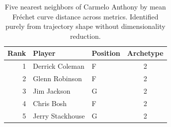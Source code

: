 \begin{table}[htbp]
  \centering\small
  \begin{tabular}{rllc}
    \toprule
    Rank & Player & Position & Archetype \\
    \midrule
    1 & Derrick Coleman & F & 2 \\
    2 & Glenn Robinson & F & 2 \\
    3 & Jim Jackson & G & 2 \\
    4 & Chris Bosh & F & 2 \\
    5 & Jerry Stackhouse & G & 2 \\
    \bottomrule
  \end{tabular}
  \caption{Five nearest neighbors of Carmelo Anthony by mean Fr\'{e}chet curve distance across metrics. Identified purely from trajectory shape without dimensionality reduction.}
  \label{tab:Carmelo_Anthony_frechet_curve_neighbors}
\end{table}

